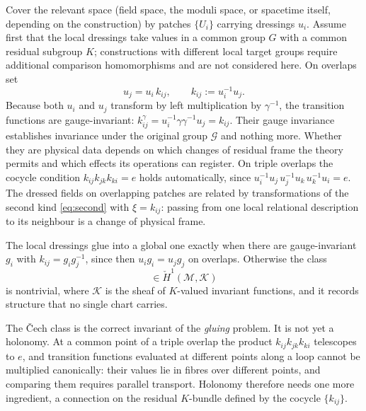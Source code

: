 \documentclass[11pt]{article}
\theoremstyle{plain}
\theoremstyle{definition}
\theoremstyle{remark}
\newcommand{\G}{\mathcal G}
\begin{document}
Cover the relevant space (field space, the moduli space, or spacetime itself, depending on the construction) by patches $\{U_i\}$ carrying dressings $u_i$. Assume first that the local dressings take values in a common group $G$ with a common residual subgroup $K$; constructions with different local target groups require additional comparison homomorphisms and are not considered here. On overlaps set
\begin{equation}\label{eq:transition}
u_j=u_i\,k_{ij},\qquad k_{ij}:=u_i^{-1}u_j .
\end{equation}
Because both $u_i$ and $u_j$ transform by left multiplication by $\gamma^{-1}$, the transition functions are gauge-invariant: $k_{ij}^\gamma=u_i^{-1}\gamma\gamma^{-1}u_j=k_{ij}$. Their gauge invariance establishes invariance under the original group $\G$ and nothing more. Whether they are physical data depends on which changes of residual frame the theory permits and which effects its operations can register. On triple overlaps the cocycle condition $k_{ij}k_{jk}k_{ki}=e$ holds automatically, since $u_i^{-1}u_j\,u_j^{-1}u_k\,u_k^{-1}u_i=e$. The dressed fields on overlapping patches are related by transformations of the second kind \eqref{eq:second} with $\xi=k_{ij}$: passing from one local relational description to its neighbour is a change of physical frame.

The local dressings glue into a global one exactly when there are gauge-invariant $g_i$ with $k_{ij}=g_i g_j^{-1}$, since then $u_i g_i=u_j g_j$ on overlaps. Otherwise the class
\begin{equation}
[k_{ij}]\in\check H^1(\mathcal M,\mathcal K)
\end{equation}
is nontrivial, where $\mathcal K$ is the sheaf of $K$-valued invariant functions, and it records structure that no single chart carries.

The Čech class is the correct invariant of the \emph{gluing} problem. It is not yet a holonomy. At a common point of a triple overlap the product $k_{ij}k_{jk}k_{ki}$ telescopes to $e$, and transition functions evaluated at different points along a loop cannot be multiplied canonically: their values lie in fibres over different points, and comparing them requires parallel transport. Holonomy therefore needs one more ingredient, a connection on the residual $K$-bundle defined by the cocycle $\{k_{ij}\}$.
\end{document}
